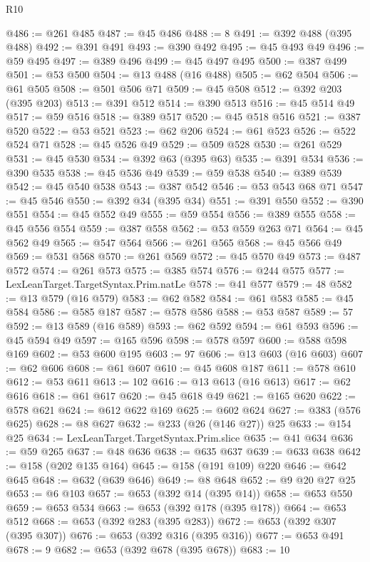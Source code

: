 \begin{lexlean}{R10}
\begin{coremodule}
@486 := @261 @485
@487 := @45 @486
@488 := 8
@491 := @392 @488 (@395 @488)
@492 := @391 @491
@493 := @390 @492
@495 := @45 @493 @49
@496 := @59 @495
@497 := @389 @496
@499 := @45 @497 @495
@500 := @387 @499
@501 := @53 @500
@504 := @13 @488 (@16 @488)
@505 := @62 @504
@506 := @61 @505
@508 := @501 @506 @71
@509 := @45 @508
@512 := @392 @203 (@395 @203)
@513 := @391 @512
@514 := @390 @513
@516 := @45 @514 @49
@517 := @59 @516
@518 := @389 @517
@520 := @45 @518 @516
@521 := @387 @520
@522 := @53 @521
@523 := @62 @206
@524 := @61 @523
@526 := @522 @524 @71
@528 := @45 @526 @49
@529 := @509 @528
@530 := @261 @529
@531 := @45 @530
@534 := @392 @63 (@395 @63)
@535 := @391 @534
@536 := @390 @535
@538 := @45 @536 @49
@539 := @59 @538
@540 := @389 @539
@542 := @45 @540 @538
@543 := @387 @542
@546 := @53 @543 @68 @71
@547 := @45 @546
@550 := @392 @34 (@395 @34)
@551 := @391 @550
@552 := @390 @551
@554 := @45 @552 @49
@555 := @59 @554
@556 := @389 @555
@558 := @45 @556 @554
@559 := @387 @558
@562 := @53 @559 @263 @71
@564 := @45 @562 @49
@565 := @547 @564
@566 := @261 @565
@568 := @45 @566 @49
@569 := @531 @568
@570 := @261 @569
@572 := @45 @570 @49
@573 := @487 @572
@574 := @261 @573
@575 := @385 @574
@576 := @244 @575
@577 := LexLeanTarget.TargetSyntax.Prim.natLe
@578 := @41 @577
@579 := 48
@582 := @13 @579 (@16 @579)
@583 := @62 @582
@584 := @61 @583
@585 := @45 @584
@586 := @585 @187
@587 := @578 @586
@588 := @53 @587
@589 := 57
@592 := @13 @589 (@16 @589)
@593 := @62 @592
@594 := @61 @593
@596 := @45 @594 @49
@597 := @165 @596
@598 := @578 @597
@600 := @588 @598 @169
@602 := @53 @600 @195
@603 := 97
@606 := @13 @603 (@16 @603)
@607 := @62 @606
@608 := @61 @607
@610 := @45 @608 @187
@611 := @578 @610
@612 := @53 @611
@613 := 102
@616 := @13 @613 (@16 @613)
@617 := @62 @616
@618 := @61 @617
@620 := @45 @618 @49
@621 := @165 @620
@622 := @578 @621
@624 := @612 @622 @169
@625 := @602 @624
@627 := @383 (@576 @625)
@628 := @8 @627
@632 := @233 (@26 (@146 @27)) @25
@633 := @154 @25
@634 := LexLeanTarget.TargetSyntax.Prim.slice
@635 := @41 @634
@636 := @59 @265
@637 := @48 @636
@638 := @635 @637
@639 := @633 @638
@642 := @158 (@202 @135 @164)
@645 := @158 (@191 @109) @220
@646 := @642 @645
@648 := @632 (@639 @646)
@649 := @8 @648
@652 := @9 @20 @27 @25
@653 := @6 @103
@657 := @653 (@392 @14 (@395 @14))
@658 := @653 @550
@659 := @653 @534
@663 := @653 (@392 @178 (@395 @178))
@664 := @653 @512
@668 := @653 (@392 @283 (@395 @283))
@672 := @653 (@392 @307 (@395 @307))
@676 := @653 (@392 @316 (@395 @316))
@677 := @653 @491
@678 := 9
@682 := @653 (@392 @678 (@395 @678))
@683 := 10

\end{coremodule}
\end{lexlean}
